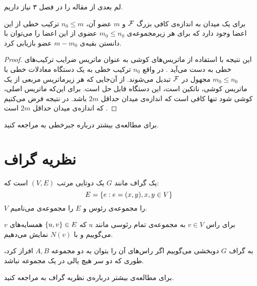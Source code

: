 لم بعدی از مقاله
\cite{pliable2015paper}
را در فصل ۳ نیاز داریم.
\begin{lemma}
	\label{lemma:pliable20151}
	برای یک میدان به اندازه‌ی کافی بزرگ
	$\mathcal{F}$
	و
	$m$
	عضو آن،
	$n_0 \leq m$
	ترکیب خطی از این اعضا وجود دارد که برای هر زیرمجموعه‌ی
	$m_0 \leq n_0$
	عضوی از این اعضا را می‌توان با دانستن بقیه‌ی
	$m - m_0$
	عضو بازیابی کرد.
\end{lemma}
\begin{proof}
این نتیجه با استفاده از ماتریس‌های کوشی به عنوان ماتریس ضرایب ترکیب‌های خطی به دست می‌آید
\cite{Blmer1995AnXE}.
در واقع
$n_0$
ترکیب خطی به یک دستگاه معادلات خطی با
$m_0 \leq n_0$
مجهول در
$\mathcal{F}$
تبدیل می‌شوند. از آن‌جایی که هر زیرماتریس مربعی از یک ماتریس کوشی، ناتکین است، این دستگاه قابل حل است. برای این‌که ماتریس اصلی، کوشی شود تنها کافی است که اندازه‌ی میدان حداقل
$2m$
باشد. در نتیجه فرض می‌کنیم که اندازه‌ی میدان حداقل
$2m$
است
\cite{pliable2015paper}.
\end{proof}
	برای مطالعه‌ی بیشتر درباره جبرخطی به
\cite{sheldon}
مراجعه کنید.
\section{نظریه گراف}
\begin{definition}[گراف]
یک گراف مانند
$G$
یک دوتایی مرتب
$(V, E)$
است که:
$$E = \left\{ e: e = (x, y), x, y \in V \right\}$$
 $V$
را مجموعه‌ی رئوس و
$E$
را مجموعه‌ی 
می‌نامیم.
\end{definition}
\begin{definition}[همسایه]
برای راس
$v\in V$
به مجمو‌عه‌ی تمام رئوسی مانند
  $u$ 
  که
  $\left\{ u,v \right\}\in E$
  همسایه‌های 
  $v$
  می‌گوییم و با
  $N(v)$
  نمایش می‌دهیم.
  \end{definition}
  \begin{definition}
  
به گراف
$G$
دوبخشی می‌گوییم اگر راس‌های آن را بتوان به دو مجموعه 
$A, B$
افراز کرد، طوری که دو سر هیچ یالی در یک مجموعه نباشد.
\end{definition}
	برای مطالعه‌ی بیشتر درباره‌ی نظریه گراف به
\cite{west}
مراجعه کنید.

